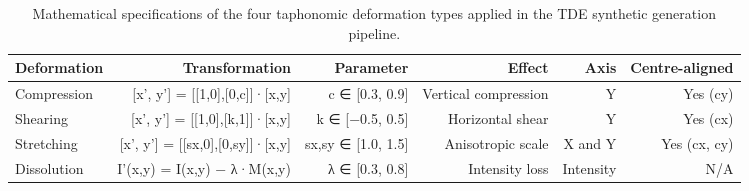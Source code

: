 \begin{table}[htbp]
\caption{Mathematical specifications of the four taphonomic deformation types applied in the TDE synthetic generation pipeline.}
\label{tab:transformations}
\begin{tabular}{lrrrrr}
\toprule
Deformation & Transformation & Parameter & Effect & Axis & Centre-aligned \\
\midrule
Compression & [x', y'] = [[1,0],[0,c]]·[x,y] & c ∈ [0.3, 0.9] & Vertical compression & Y & Yes (cy) \\
Shearing & [x', y'] = [[1,0],[k,1]]·[x,y] & k ∈ [−0.5, 0.5] & Horizontal shear & Y & Yes (cx) \\
Stretching & [x', y'] = [[sx,0],[0,sy]]·[x,y] & sx,sy ∈ [1.0, 1.5] & Anisotropic scale & X and Y & Yes (cx, cy) \\
Dissolution & I'(x,y) = I(x,y) − λ·M(x,y) & λ ∈ [0.3, 0.8] & Intensity loss & Intensity & N/A \\
\bottomrule
\end{tabular}
\end{table}
